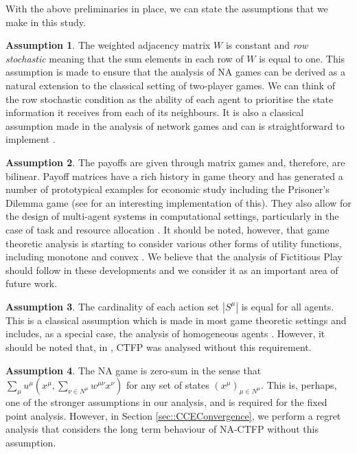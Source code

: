 \documentclass{article}
\theoremstyle{definition}
\newtheorem{assumption}{Assumption}
\newcommand{\weightset}{W}
\newcommand{\actionset}[1]{S^{#1}}
\newcommand{\wmunu}{w^{\mu \nu}}
\newcommand{\xmu}{x^{\mu}}
\newcommand{\xnu}{x^{\nu}}
\newcommand{\weightedsum}{ \sum_{\nu \in N^\mu} \wmunu \xnu}
\begin{document}
  With the above preliminaries in place, we can state the assumptions that we make in this study.

  \begin{assumption}\label{ass::rowstochastic}
    The weighted adjacency matrix $\weightset$ is constant and \emph{row stochastic} meaning
    that the sum elements in each row of $\weightset$ is equal to one. This assumption is
    made to ensure that the analysis of NA games can be derived as a natural extension to the
    classical setting of two-player games. We can think of the row stochastic condition as the
    ability of each agent to prioritise the state information it receives from each of its
    neighbours. It is also a classical assumption made in the analysis of network games
    \cite{one of the network game papers} and can is straightforward to implement \cite{Eyad}.
  \end{assumption}

  \begin{assumption}\label{ass::matrixgame}
    The payoffs are given through matrix games and, therefore, are bilinear. Payoff matrices
    have a rich history in game theory and has generated a number of prototypical examples for
    economic study including the Prisoner's Dilemma game (see \cite{Axelrod} for an interesting
    implementation of this). They also allow for the design of multi-agent systems in
    computational settings, particularly in the case of task and resource allocation \cite{AGT
    and some of the Applied Game Theory Papers}. It should be noted, however, that game
    theoretic analysis is starting to consider various other forms of utility functions,
    including monotone \cite{Maryam} and convex \cite{Parise}. We believe that the analysis of
    Fictitious Play should follow in these developments and we consider it as an important area
    of future work.
  \end{assumption}

  \begin{assumption}\label{ass::sameactions}
    The cardinality of each action set $|\actionset{\mu}|$ is equal for all agents. This is
    a classical assumption which is made in most game theoretic settings and includes, as a
    special case, the analysis of homogeneous agents \cite{}. However, it should be noted that,
    in \cite{Ewerhart}, CTFP was analysed without this requirement.  
  \end{assumption}

  \begin{assumption}\label{ass::zerosum}
    The NA game is zero-sum in the sense that $\sum_{\mu} u^\mu(\xmu, \weightedsum)$ for any set
    of states $(x^\mu)_{\mu \in N^\mu}$. This is, perhaps, one of the stronger assumptions in
    our analysis, and is required for the fixed point analysis. However, in Section
    \ref{sec::CCEConvergence}, we perform a regret analysis that considers the long term
    behaviour of NA-CTFP without this assumption.
  \end{assumption}
\end{document}
